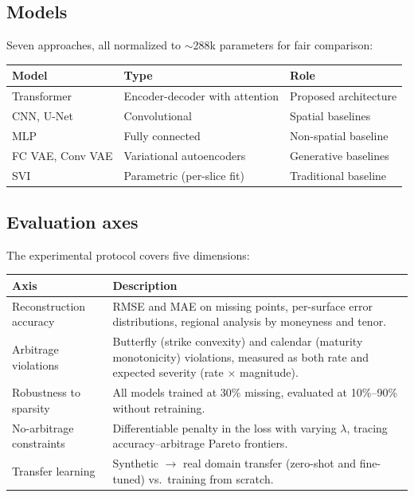 \documentclass[11pt, a4paper]{article}
\begin{document}
\subsection*{Models}

Seven approaches, all normalized to ${\sim}$288k parameters for fair comparison:

\begin{table}[H]
    \centering
    \begin{tabular}{lll}
        \toprule
        Model & Type & Role \\
        \midrule
        Transformer & Encoder-decoder with attention & Proposed architecture \\
        CNN, U-Net & Convolutional & Spatial baselines \\
        MLP & Fully connected & Non-spatial baseline \\
        FC VAE, Conv VAE & Variational autoencoders & Generative baselines \\
        SVI & Parametric (per-slice fit) & Traditional baseline \\
        \bottomrule
    \end{tabular}
\end{table}

\subsection*{Evaluation axes}

The experimental protocol covers five dimensions:

\begin{table}[H]
    \centering
    \small
    \begin{tabular}{lp{9.5cm}}
        \toprule
        Axis & Description \\
        \midrule
        Reconstruction accuracy & RMSE and MAE on missing points, per-surface error distributions, regional analysis by moneyness and tenor. \\
        Arbitrage violations & Butterfly (strike convexity) and calendar (maturity monotonicity) violations, measured as both rate and expected severity (rate $\times$ magnitude).\footnotemark \\
        Robustness to sparsity & All models trained at 30\% missing, evaluated at 10\%--90\% without retraining. \\
        No-arbitrage constraints & Differentiable penalty in the loss with varying $\lambda$, tracing accuracy--arbitrage Pareto frontiers. \\
        Transfer learning & Synthetic $\to$ real domain transfer (zero-shot and fine-tuned) vs.\ training from scratch. \\
        \bottomrule
    \end{tabular}
\end{table}
\end{document}
